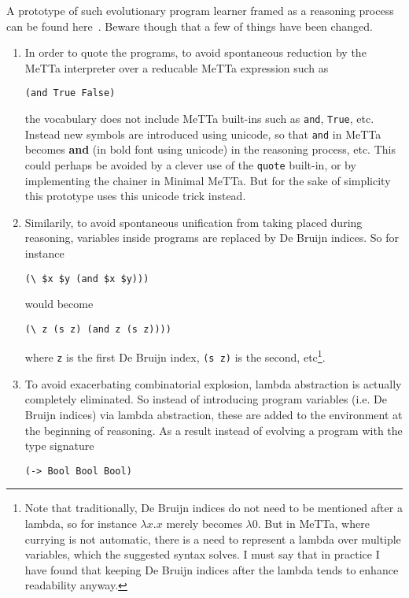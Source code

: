 \documentclass[]{report}
\begin{document}
A prototype of such evolutionary program learner framed as a reasoning
process can be found here~\cite{EvoReason}.  Beware though that a few
of things have been changed.
\begin{enumerate}
\item In order to quote the programs, to avoid spontaneous reduction by
the MeTTa interpreter over a reducable MeTTa expression such as

\begin{verbatim}
(and True False)
\end{verbatim}
the vocabulary does not include MeTTa built-ins such as
\texttt{and}, \texttt{True}, etc.  Instead new symbols are introduced using unicode,
so that \texttt{and} in MeTTa becomes \textbf{and} (in
bold font using unicode) in the reasoning process, etc.  This could
perhaps be avoided by a clever use of the \texttt{quote}
built-in, or by implementing the chainer in Minimal MeTTa.  But for
the sake of simplicity this prototype uses this unicode trick instead.
\item Similarily, to avoid spontaneous unification from taking placed
during reasoning, variables inside programs are replaced by De Bruijn
indices.  So for instance
\begin{verbatim}
(\ $x $y (and $x $y)))
\end{verbatim}
would become
\begin{verbatim}
(\ z (s z) (and z (s z))))
\end{verbatim}
where \texttt{z} is the first De Bruijn
index, \texttt{(s z)} is the second, etc\footnote{Note
that traditionally, De Bruijn indices do not need to be mentioned
after a lambda, so for instance $\lambda x.x$ merely becomes $\lambda
0$.  But in MeTTa, where currying is not automatic, there is a need to
represent a lambda over multiple variables, which the suggested syntax
solves.  I must say that in practice I have found that keeping De
Bruijn indices after the lambda tends to enhance readability anyway.}.
\item To avoid exacerbating combinatorial explosion, lambda abstraction is
actually completely eliminated.  So instead of introducing program
variables (i.e. De Bruijn indices) via lambda abstraction, these are
added to the environment at the beginning of reasoning.  As a result
instead of evolving a program with the type
signature
\begin{verbatim}
(-> Bool Bool Bool)
\end{verbatim}

\end{enumerate}
\end{document}

